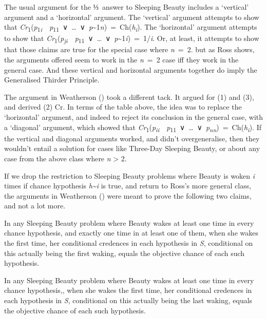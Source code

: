 \documentclass[
  10pt,
  letterpaper,
  DIV=11,
  numbers=noendperiod,
  twoside]{scrartcl}
\providecommand{\tightlist}{%
  \setlength{\itemsep}{0pt}\setlength{\parskip}{0pt}}\usepackage{longtable,booktabs,array}
\begin{document}
The usual argument for the ⅓~answer to Sleeping Beauty includes a
`vertical' argument and a `horizontal' argument. The `vertical' argument
attempts to show that
\emph{Cr}\textsubscript{1}(\emph{p}\textsubscript{1\emph{i}}~\textbar~\emph{p}\textsubscript{11}~∨~\ldots~∨~\emph{p}\textasciitilde1\emph{n})~=~Ch(\emph{h\textsubscript{i}}).
The `horizontal' argument attempts to show that
\emph{Cr}\textsubscript{1}(\emph{p\textsubscript{ji}}~\textbar~\emph{p}\textsubscript{11}~∨~\ldots~∨~\emph{p}\textasciitilde1\emph{i})~=~1/\emph{i}.
Or, at least, it attempts to show that those claims are true for the
special case where \emph{n}~=~2. but as Ross shows, the arguments
offered seem to work in the \emph{n}~=~2 case iff they work in the
general case. And these vertical and horizontal arguments together do
imply the Generalised Thirder Principle.

The argument in Weatherson () took a
different tack. It argued for (1) and (3), and derived (2) Cr. In terms
of the table above, the idea was to replace the `horizontal' argument,
and indeed to reject its conclusion in the general case, with a
`diagonal' argument, which showed that
\emph{Cr}\textsubscript{1}(\emph{p\textsubscript{ii}}~\textbar~\emph{p}\textsubscript{11}~∨~\ldots~∨~\emph{p\textsubscript{nn}})~=~Ch(\emph{h\textsubscript{i}}).
If the vertical and diagonal arguments worked, and didn't
overgeneralise, then they wouldn't entail a solution for cases like
Three-Day Sleeping Beauty, or about any case from the above class where
\emph{n} \textgreater{} 2.

If we drop the restriction to Sleeping Beauty problems where Beauty is
woken \emph{i} times if chance hypothesis \emph{h\textasciitilde i} is
true, and return to Ross's more general class, the arguments in
Weatherson () were meant to prove
the following two claims, and not a lot more.

\begin{description}
\tightlist
\item[First Day]
In any Sleeping Beauty problem where Beauty wakes at least one time in
every chance hypothesis, and exactly one time in at least one of them,
when she wakes the first time, her conditional credences in each
hypothesis in \emph{S}, conditional on this actually being the first
waking, equals the objective chance of each such hypothesis.
\item[Last Day]
In any Sleeping Beauty problem where Beauty wakes at least one time in
every chance hypothesis,, when she wakes the first time, her conditional
credences in each hypothesis in \emph{S}, conditional on this actually
being the last waking, equals the objective chance of each such
hypothesis.
\end{description}
\end{document}
